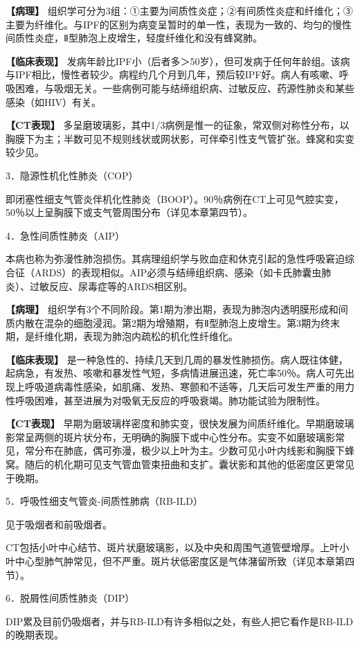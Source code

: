\textbf{【病理】}
组织学可分为3组：①主要为间质性炎症；②有间质性炎症和纤维化；③主要为纤维化。与IPF的区别为病变呈暂时的单一性，表现为一致的、均匀的慢性间质性炎症，Ⅱ型肺泡上皮增生，轻度纤维化和没有蜂窝肺。

\textbf{【临床表现】}
发病年龄比IPF小（后者多＞50岁），但可发病于任何年龄组。该病与IPF相比，慢性者较少。病程约几个月到几年，预后较IPF好。病人有咳嗽、呼吸困难，与吸烟无关。一些病例可能与结缔组织病、过敏反应、药源性肺炎和某些感染（如HIV）有关。

\textbf{【CT表现】}
多呈磨玻璃影，其中1/3病例是惟一的征象，常双侧对称性分布，以胸膜下为主；半数可见不规则线状或网状影，可伴牵引性支气管扩张。蜂窝和实变较少见。

3．隐源性机化性肺炎（COP）

即闭塞性细支气管炎伴机化性肺炎（BOOP）。90％病例在CT上可见气腔实变，50％以上呈胸膜下或支气管周围分布（详见本章第四节）。

4．急性间质性肺炎（AIP）

本病也称为弥漫性肺泡损伤。其病理组织学与败血症和休克引起的急性呼吸窘迫综合征（ARDS）的表现相似。AIP必须与结缔组织病、感染（如卡氏肺囊虫肺炎）、过敏反应、尿毒症等的ARDS相区别。

\textbf{【病理】}
组织学有3个不同阶段。第1期为渗出期，表现为肺泡内透明膜形成和间质内散在混杂的细胞浸润。第2期为增殖期，有Ⅱ型肺泡上皮增生。第3期为终末期，是纤维化期，表现为肺泡内疏松的机化性纤维化。

\textbf{【临床表现】}
是一种急性的、持续几天到几周的暴发性肺损伤。病人既往体健，起病急，有发热、咳嗽和暴发性气短，多病情进展迅速，死亡率50％。病人可先出现上呼吸道病毒性感染，如肌痛、发热、寒颤和不适等，几天后可发生严重的用力性呼吸困难，甚至进展为对吸氧无反应的呼吸衰竭。肺功能试验为限制性。

\textbf{【CT表现】}
早期为磨玻璃样密度和肺实变，很快发展为间质纤维化。早期磨玻璃影常呈两侧的斑片状分布，无明确的胸膜下或中心性分布。实变不如磨玻璃影常见，常分布在肺底，偶可弥漫，极少以上叶为主。少数可见小叶内线影和胸膜下蜂窝。随后的机化期可见支气管血管束扭曲和支扩。囊状影和其他的低密度区更常见于晚期。

5．呼吸性细支气管炎-间质性肺病（RB-ILD）

见于吸烟者和前吸烟者。

CT包括小叶中心结节、斑片状磨玻璃影，以及中央和周围气道管壁增厚。上叶小叶中心型肺气肿常见，但不严重。斑片状低密度区是气体潴留所致（详见本章第四节）。

6．脱屑性间质性肺炎（DIP）

DIP累及目前仍吸烟者，并与RB-ILD有许多相似之处，有些人把它看作是RB-ILD的晚期表现。

